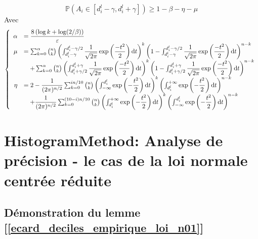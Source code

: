 \[
    \mathbb P\left( A_i \in [d_i^l-\gamma, d_i^l + \gamma] \right) \geq 1 - \beta - \eta -\mu    
\]
Avec 
\[
    \left\{ 
        \begin{array}{rl}
            \alpha & = \dfrac{8\left( \log k + \log(2/\beta) \right)}{\varepsilon} \\
            \mu & = \sum_{k = 0}^\alpha \binom{n}{k}\left( \int_{d^l_i - \gamma}^{d^l_i -\gamma/2}\dfrac{1}{\sqrt{2\pi}} \exp\left( \dfrac{-t^2}{2} \right)\mathrm{d} t \right)^k \left( 1 - \int_{d^l_i - \gamma}^{d^l_i -\gamma/2}\dfrac{1}{\sqrt{2\pi}} \exp\left( \dfrac{-t^2}{2} \right)\mathrm{d} t \right)^{n - k}\\
            & \quad + \sum_{k = 0}^\alpha \binom{n}{k}\left( \int_{d^l_i + \gamma/2}^{d^l_i +\gamma}\dfrac{1}{\sqrt{2\pi}} \exp\left( \dfrac{-t^2}{2} \right)\mathrm{d} t \right)^k \left( 1 - \int_{d^l_i + \gamma/2}^{d^l_i +\gamma}\dfrac{1}{\sqrt{2\pi}} \exp\left( \dfrac{-t^2}{2} \right)\mathrm{d} t\right)^{n - k}\\
            \eta & = 2 - \dfrac{1}{(2\pi)^{n/2}}\sum_{k = 0}^{in/10}\binom{n}{k}\left( \int_{-\infty}^{d^l_i}\exp\left( -\dfrac{t^2}{2} \right)\mathrm{d} t \right)^k \left( \int_{d^l_i}^{+\infty}\exp\left( -\dfrac{t^2}{2} \right)\mathrm{d} t  \right)^{n - k}\\
            & \quad + \dfrac{1}{(2\pi)^{n/2}}\sum_{k = 0}^{(10-i)n/10}\binom{n}{k}\left( \int_{d^l_i}^{+\infty}\exp\left( -\dfrac{t^2}{2} \right)\mathrm{d} t \right)^k \left( \int_{-\infty}^{d^l_i}\exp\left( -\dfrac{t^2}{2} \right)\mathrm{d} t  \right)^{n - k} 
        \end{array}
    \right.    
\]

\newpage

\appendix
\section{HistogramMethod: Analyse de précision - le cas de la loi normale centrée réduite}
\label{hmncr}
\subsection{Démonstration du lemme [\ref{ecard_deciles_empirique_loi_n01}]}

